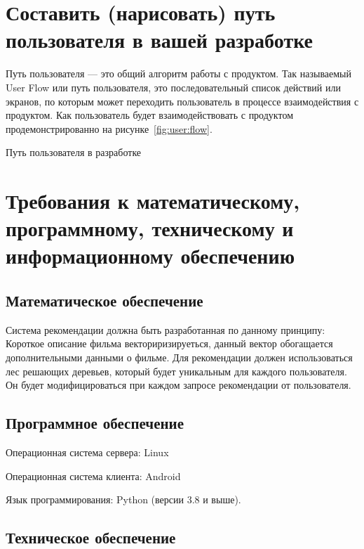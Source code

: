 \section{Составить (нарисовать) путь пользователя в вашей разработке}

Путь пользователя --- это общий алгоритм работы с продуктом. Так
называемый User Flow или путь пользователя, это последовательный
список действий или экранов, по которым может переходить
пользователь в процессе взаимодействия с продуктом.
Как пользователь будет взаимодействовать с продуктом
продемонстрированно на рисунке~\ref{fig:user:flow}.

\begin{image}
	\caption{Путь пользователя в разработке}
	\label{fig:user:flow}
\end{image}

\clearpage

\section{Требования к математическому, программному,
	техническому и информационному обеспечению}

\subsection{Математическое обеспечение}

Система рекомендации должна быть разработанная по данному
принципу: Короткое описание фильма векториризируеться, данный вектор
обогащается дополнительными данными о фильме.
Для рекомендации должен использоваться лес решающих деревьев,
который будет уникальным для каждого пользователя. Он будет
модифицироваться при каждом запросе рекомендации от пользователя.

\subsection{Программное обеспечение}

Операционная система сервера: Linux \par
Операционная система клиента: Android \par
Язык программирования: Python (версии 3.8 и выше).\par

\subsection{Техническое обеспечение}

